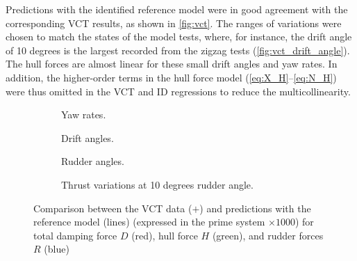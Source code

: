 Predictions with the identified reference model were in good agreement with the corresponding VCT results, as shown in \autoref{fig:vct}. The ranges of variations were chosen to match the states of the model tests, where, for instance, the drift angle of 10 degrees is the largest recorded from the zigzag tests (\autoref{fig:vct_drift_angle}). The hull forces are almost linear for these small drift angles and yaw rates. In addition, the higher-order terms in the hull force model (\autoref{eq:X_H}--\autoref{eq:N_H}) were thus omitted in the VCT and ID regressions to reduce the multicollinearity.
\begin{figure}
    \centering
    \begin{subfigure}[b]{0.49\textwidth}
        \centering
        
        \caption{Yaw rates.}
        \label{fig:vct_circle}
    \end{subfigure}
    \hfill
    \begin{subfigure}[b]{0.49\textwidth}
        \centering
        
        \caption{Drift angles.}
        \label{fig:vct_drift_angle}
    \end{subfigure}
    \begin{subfigure}[b]{0.49\textwidth}
        \centering
        
        \caption{Rudder angles.}
        \label{fig:vct_rudder_angle}
    \end{subfigure}
    \hfill
    \begin{subfigure}[b]{0.49\textwidth}
        \centering
        
        \caption{Thrust variations at 10 degrees rudder angle.}
        \label{fig:vct_thrust_variation}
    \end{subfigure}
    \caption{Comparison between the VCT data ($+$) and predictions with the reference model (lines) (expressed in the prime system $\times 1000$) for total damping force $D$ (red), hull force $H$ (green), and rudder forces $R$ (blue)}
    \label{fig:vct}
\end{figure}